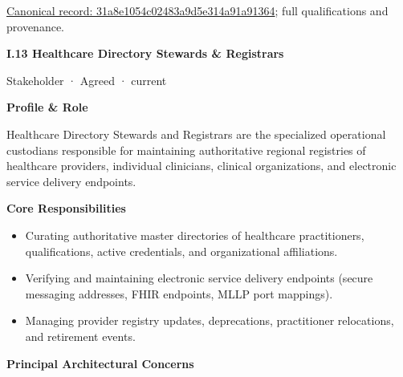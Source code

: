 {\footnotesize \href{../../../../continuum/motivation/stakeholder/31a8e1054c02483a9d5e314a91a91364.md}{Canonical record: 31a8e1054c02483a9d5e314a91a91364}; full qualifications and provenance.}\par
\par\medskip{}\label{navigation:I.13}
\textbf{I.13 Healthcare Directory Stewards \& Registrars}\par

\label{element:1c8e2c898a28436693cf2ae69776e125}
{\small Stakeholder · Agreed · current}\par

\par\medskip\textbf{Profile \& Role}\par


Healthcare Directory Stewards and Registrars are the specialized operational custodians responsible for maintaining authoritative regional registries of healthcare providers, individual clinicians, clinical organizations, and electronic service delivery endpoints.



\par\medskip\textbf{Core Responsibilities}\par


\begin{itemize}


\item Curating authoritative master directories of healthcare practitioners, qualifications, active credentials, and organizational affiliations.

\item Verifying and maintaining electronic service delivery endpoints (secure messaging addresses, FHIR endpoints, MLLP port mappings).

\item Managing provider registry updates, deprecations, practitioner relocations, and retirement events.

\end{itemize}


\par\medskip\textbf{Principal Architectural Concerns}\par


